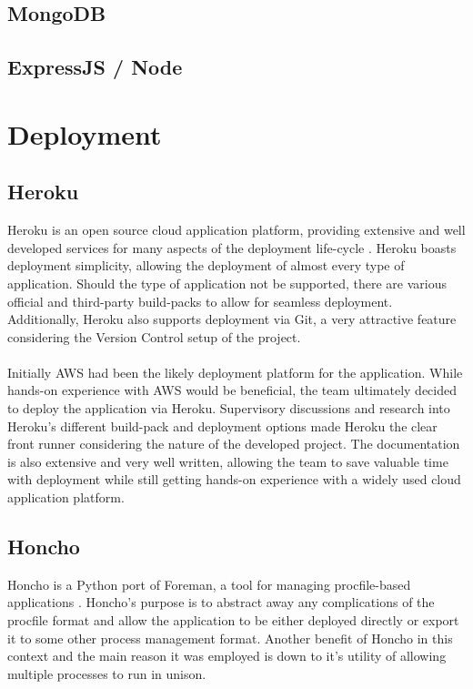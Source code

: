 \subsection{MongoDB}
\subsection{ExpressJS / Node}

\section{Deployment}
\subsection{Heroku}
Heroku is an open source cloud application platform, providing extensive and well developed services for many aspects of the deployment life-cycle \cite{HEROKU}. Heroku boasts deployment simplicity, allowing the deployment of almost every type of application. Should the type of application not be supported, there are various official and third-party build-packs to allow for seamless deployment. Additionally, Heroku also supports deployment via Git, a very attractive feature considering the Version Control setup of the project.

\paragraph{}
Initially AWS had been the likely deployment platform for the application. While hands-on experience with AWS would be beneficial, the team ultimately decided to deploy the application via Heroku. Supervisory discussions and research into Heroku's different build-pack and deployment options made Heroku the clear front runner considering the nature of the developed project. The documentation is also extensive and very well written, allowing the team to save valuable time with deployment while still getting hands-on experience with a widely used cloud application platform.

\subsection{Honcho}
Honcho is a Python port of Foreman, a tool for managing procfile-based applications \cite{HONCHO}. Honcho's purpose is to abstract away any complications of the procfile format and allow the application to be either deployed directly or export it to some other process management format. Another benefit of Honcho in this context and the main reason it was employed is down to it's utility of allowing multiple processes to run in unison.

